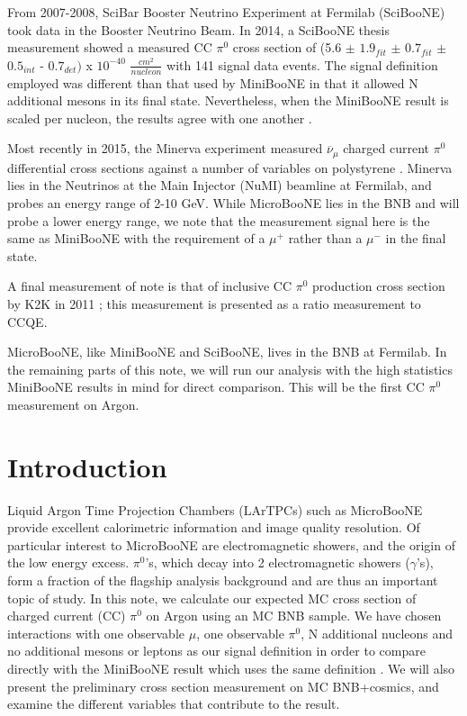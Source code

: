 \documentclass[a4paper]{article}
\begin{document}
\par From 2007-2008, SciBar Booster Neutrino Experiment at Fermilab (SciBooNE) took data in the Booster Neutrino Beam.  In 2014, a SciBooNE thesis measurement showed a measured CC $\pi^0$ cross section of (5.6 $\pm$ $1.9_{fit}$ $\pm$ $0.7_{fit}$ $\pm$ $0.5_{int}$ - $0.7_{det})$ x $10^{-40}$ $\frac{cm^2}{nucleon}$ with 141 signal data events. The signal definition employed was different than that used by MiniBooNE in that it allowed N additional mesons in its final state.  Nevertheless, when the MiniBooNE result is scaled per nucleon, the results agree with one another \cite{bib:sciboone_thesis}.
\par Most recently in 2015, the Minerva experiment measured $\overline{\nu}_\mu$ charged current $\pi^0$ differential cross sections against a number of variables  on polystyrene \cite{bib:minerva_thesis} \cite{bib:minerva_paper}.  Minerva lies in the Neutrinos at the Main Injector (NuMI) beamline at Fermilab, and probes an energy range of 2-10 GeV.  While MicroBooNE lies in the BNB and will probe a lower energy range, we note that the measurement signal here is the same as MiniBooNE with the requirement of a $\mu^+$ rather than a $\mu^-$ in the final state. 
\par A final measurement of note is that of inclusive CC $\pi^0$ production cross section by K2K in 2011 \cite{bib:k2k_paper}; this measurement is presented as a ratio measurement to CCQE.  
\par MicroBooNE, like MiniBooNE and SciBooNE, lives in the BNB at Fermilab.  In the remaining parts of this note, we will run our analysis with the high statistics MiniBooNE results in mind for direct comparison.  This will be the first CC $\pi^0$ measurement on Argon.

\section{Introduction}
\label{sec:intro}

\par Liquid Argon Time Projection Chambers (LArTPCs) such as MicroBooNE provide excellent calorimetric information and image quality resolution. Of particular interest to MicroBooNE are electromagnetic showers, and the origin of the low energy excess. $\pi^0$'s, which decay into 2 electromagnetic showers ($\gamma$'s), form a fraction of the flagship analysis background and are thus an important topic of study. In this note, we calculate our expected MC cross section of charged current (CC) $\pi^0$ on Argon using an MC BNB sample. We have chosen interactions with one observable $\mu$, one observable $\pi^0$, N additional nucleons and no additional mesons or leptons as our signal definition in order to compare directly with the MiniBooNE result which uses the same definition \cite{bib:numucc_miniboone}. We will also present the preliminary cross section measurement on MC BNB+cosmics, and examine the different variables that contribute to the result.
\end{document}
